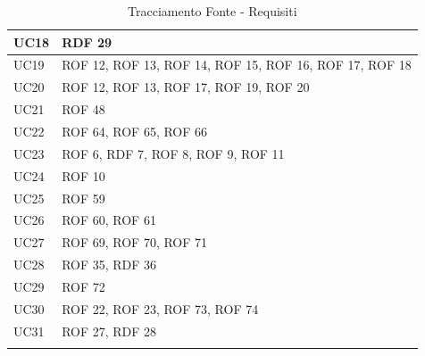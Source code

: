 \documentclass[12pt, oneside]{article}
\begin{document}
\begin{longtable}{|p{4cm}|p{12cm}|}
    \hline
    UC18 & RDF 29 \\
    \hline
    UC19 & ROF 12, ROF 13, ROF 14, ROF 15, ROF 16, ROF 17, ROF 18 \\
    \hline
    UC20 & ROF 12, ROF 13, ROF 17, ROF 19, ROF 20\\
    \hline
    UC21 & ROF 48 \\
    \hline
    UC22 & ROF 64, ROF 65, ROF 66 \\
    \hline
    UC23 & ROF 6, RDF 7, ROF 8, ROF 9, ROF 11 \\
    \hline
    UC24 & ROF 10\\
    \hline
    UC25 & ROF 59 \\
    \hline
    UC26 & ROF 60, ROF 61 \\
    \hline
    UC27 & ROF 69, ROF 70, ROF 71 \\
    \hline
    UC28 & ROF 35, RDF 36 \\
    \hline
    UC29 & ROF 72 \\
    \hline
    UC30 & ROF 22, ROF 23, ROF 73, ROF 74 \\
    \hline
    UC31 & ROF 27, RDF 28 \\
    \hline

\caption{Tracciamento Fonte - Requisiti}
    
\end{longtable}
\end{document}
